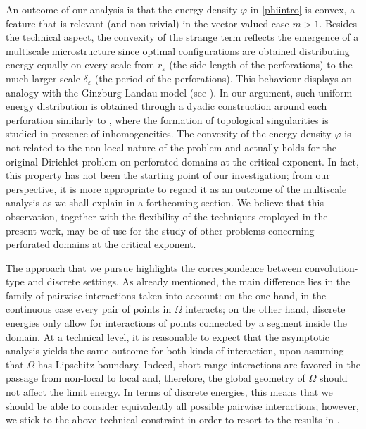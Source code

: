 \documentclass{article}
\theoremstyle{plain}
\theoremstyle{definition}
\def\e{\varepsilon}
\numberwithin{equation}{section}
\begin{document}
An outcome of our analysis is that the energy density $\varphi$ in \eqref{phiintro} is convex, a feature that is relevant (and non-trivial) in the vector-valued case $m>1$. Besides the technical aspect, the convexity of the strange term reflects the emergence of a multiscale microstructure since optimal configurations are obtained distributing energy equally on every scale from $r_\e$ (the side-length of the perforations) to the much larger scale $\delta_\e$ (the period of the perforations). This behaviour displays an analogy with the Ginzburg-Landau model (see \cite{BBH, Jer, San}). In our argument, such uniform energy distribution is obtained through a dyadic construction around each perforation similarly to \cite{ABCDP}, where the formation of topological singularities is studied in presence of inhomogeneities. The convexity of the energy density $\varphi$ is not related to the non-local nature of the problem and actually holds for the original Dirichlet problem on perforated domains at the critical exponent. In fact, this property has not been the starting point of our investigation; from our perspective, it is more appropriate to regard it as an outcome of the multiscale analysis as we shall explain in a forthcoming section. We believe that this observation, together with the flexibility of the techniques employed in the present work, may be of use for the study of other problems concerning perforated domains at the critical exponent.     

\smallskip

The approach that we pursue highlights the correspondence between convolution-type and discrete settings. As already mentioned, the main difference lies in the family of pairwise interactions taken into account: on the one hand, in the continuous case every pair of points in $\Omega$ interacts; on the other hand, discrete energies only allow for interactions of points connected by a segment inside the domain. At a technical level, it is reasonable to expect that the asymptotic analysis yields the same outcome for both kinds of interaction, upon assuming that $\Omega$ has Lipschitz boundary. Indeed, short-range interactions are favored in the passage from non-local to local and, therefore, the global geometry of $\Omega$ should not affect the limit energy. In terms of discrete energies, this means that we should be able to consider equivalently all possible pairwise interactions; however, we stick to the above technical constraint in order to resort to the results in \cite{AliCic}. 
\end{document}
